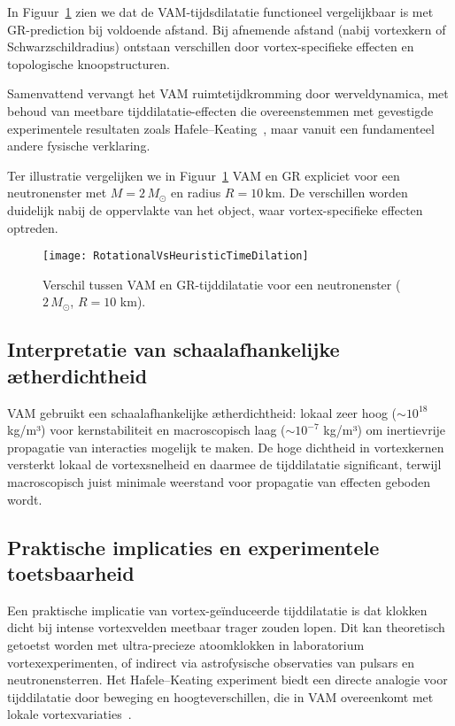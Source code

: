 In Figuur~\ref{fig:vergelijkingVAMGR} zien we dat de VAM-tijdsdilatatie functioneel vergelijkbaar is met GR-prediction bij voldoende afstand. Bij afnemende afstand (nabij vortexkern of Schwarzschildradius) ontstaan verschillen door vortex-specifieke effecten en topologische knoopstructuren.

Samenvattend vervangt het VAM ruimtetijdkromming door werveldynamica, met behoud van meetbare tijddilatatie-effecten die overeenstemmen met gevestigde experimentele resultaten zoals Hafele–Keating~\cite{hafele1972around}, maar vanuit een fundamenteel andere fysische verklaring.


Ter illustratie vergelijken we in Figuur~\ref{fig:vergelijkingVAMGR} VAM en GR expliciet voor een neutronenster met $M = 2\,M_\odot$ en radius $R = 10\,\text{km}$. De verschillen worden duidelijk nabij de oppervlakte van het object, waar vortex-specifieke effecten optreden.

\begin{figure}[ht!]
    \centering
    \texttt{[image: RotationalVsHeuristicTimeDilation]}
    \caption{Verschil tussen VAM en GR-tijddilatatie voor een neutronenster ($2\,M_\odot$, $R=10$ km).}
    \label{fig:vergelijkingVAMGR}
\end{figure}

\subsection{Interpretatie van schaalafhankelijke ætherdichtheid}

VAM gebruikt een schaalafhankelijke ætherdichtheid: lokaal zeer hoog ($\sim10^{18}$ kg/m³) voor kernstabiliteit en macroscopisch laag ($\sim10^{-7}$ kg/m³) om inertievrije propagatie van interacties mogelijk te maken. De hoge dichtheid in vortexkernen versterkt lokaal de vortexsnelheid en daarmee de tijddilatatie significant, terwijl macroscopisch juist minimale weerstand voor propagatie van effecten geboden wordt.

\subsection{Praktische implicaties en experimentele toetsbaarheid}

Een praktische implicatie van vortex-geïnduceerde tijddilatatie is dat klokken dicht bij intense vortexvelden meetbaar trager zouden lopen. Dit kan theoretisch getoetst worden met ultra-precieze atoomklokken in laboratorium vortexexperimenten, of indirect via astrofysische observaties van pulsars en neutronensterren. Het Hafele–Keating experiment biedt een directe analogie voor tijddilatatie door beweging en hoogteverschillen, die in VAM overeenkomt met lokale vortexvariaties~\cite{hafele1972around}.
